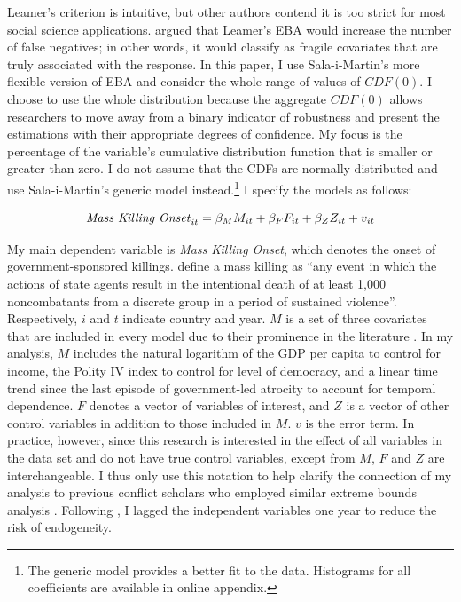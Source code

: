 \documentclass[a4paper,12pt]{article}
\begin{document}
Leamer's criterion is intuitive, but other authors contend it is too strict for most social science applications. \cite{sala1997just} argued that Leamer's EBA would increase the number of false negatives; in other words, it would classify as fragile covariates that are truly associated with the response. In this paper, I use Sala-i-Martin's \citeyear{sala1997just} more flexible version of EBA and consider the whole range of values of $CDF(0)$. I choose to use the whole distribution because the aggregate $CDF(0)$ allows researchers to move away from a binary indicator of robustness and present the estimations with their appropriate degrees of confidence. My focus is the percentage of the variable's cumulative distribution function that is smaller or greater than zero. I do not assume that the CDFs are normally distributed and use Sala-i-Martin's generic model instead.\footnote{The generic model provides a better fit to the data. Histograms for all coefficients are available in online appendix.} I specify the models as follows:
	
\begin{equation}
\text{\textit{Mass Killing Onset}}_{it} = \beta_{M}M_{it} + \beta_{F}F_{it} + \beta_{Z}Z_{it} + v_{it}
\end{equation}
	
My main dependent variable is \textit{Mass Killing Onset}, which denotes the onset of government-sponsored killings. \citet[2]{ulfelder2008assessing} define a mass killing as ``any event in which the actions of state agents result in the intentional death of at least 1,000 noncombatants from a discrete group in a period of sustained violence''. Respectively, $i$ and $t$ indicate country and year. $M$ is a set of three covariates that are included in every model due to their prominence in the literature \citep{levine1992vale}. In my analysis, $M$ includes the natural logarithm of the GDP per capita to control for income, the Polity IV index to control for level of democracy, and a linear time trend since the last episode of government-led atrocity to account for temporal dependence. $F$ denotes a vector of variables of interest, and $Z$ is a vector of other control variables in addition to those included in $M$. $v$ is the error term. In practice, however, since this research is interested in the effect of all variables in the data set and do not have true control variables, except from $M$, $F$ and $Z$ are interchangeable. I thus only use this notation to help clarify the connection of my analysis to previous conflict scholars who employed similar extreme bounds analysis \citep[e.g.,][]{hegre2006sensitivity,gassebner2016expect}. Following \citet[514]{hegre2006sensitivity}, I lagged the independent variables one year to reduce the risk of endogeneity. 
\end{document}
